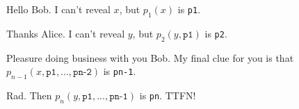 {\color{blue}{\footnotesize Alice is given input $x$.}}
\pause
\begin{leftbubbles}
{\footnotesize Hello Bob.  I can't reveal $x$, but $p_1(x)$ is \texttt{p1}.}
\end{leftbubbles}
\pause
\rightline{{\color{olive}{\footnotesize Bob is given input $y$.}}}
\pause
\begin{rightbubbles}
{\footnotesize Thanks Alice.  I can't reveal $y$, but $p_2(y, \texttt{p1})$ is \texttt{p2}.}
\end{rightbubbles}
\pause
{}
\pause
\begin{leftbubbles}
{\footnotesize Pleasure doing business with you Bob.  My final clue for you is that $p_{n-1}(x, \texttt{p1}, ..., \texttt{pn-2})$ is \texttt{pn-1}.}
\end{leftbubbles}
\pause
\begin{rightbubbles}
{\footnotesize Rad.  Then $p_n(y, \texttt{p1}, ..., \texttt{pn-1})$ is \texttt{pn}.  TTFN!}
\end{rightbubbles}